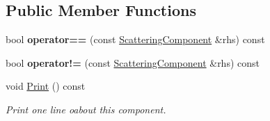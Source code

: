 \subsection*{Public Member Functions}
\begin{DoxyCompactItemize}
\item 
\mbox{\label{struct_obj_cryst_1_1_scattering_component_a7a81dadab64eff4390c899f743d4db9e}} 
bool {\bfseries operator==} (const \mbox{\hyperlink{struct_obj_cryst_1_1_scattering_component}{Scattering\+Component}} \&rhs) const
\item 
\mbox{\label{struct_obj_cryst_1_1_scattering_component_a271a7065255a803a81b4096529089366}} 
bool {\bfseries operator!=} (const \mbox{\hyperlink{struct_obj_cryst_1_1_scattering_component}{Scattering\+Component}} \&rhs) const
\item 
\mbox{\label{struct_obj_cryst_1_1_scattering_component_aa5f12303524dfe44ea5606a352b87746}} 
void \mbox{\hyperlink{struct_obj_cryst_1_1_scattering_component_aa5f12303524dfe44ea5606a352b87746}{Print}} () const
\begin{DoxyCompactList}\small\item\em Print one line oabout this component. \end{DoxyCompactList}\end{DoxyCompactItemize}
